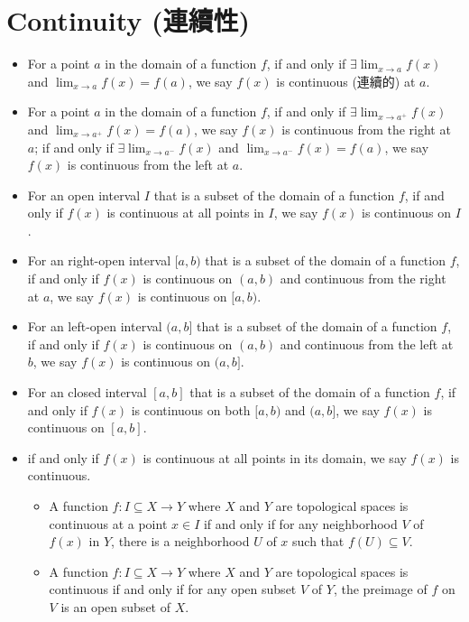 \documentclass[a4paper,12pt]{report}
\begin{document}
\section{Continuity (連續性)}
\begin{itemize}
\item For a point $a$ in the domain of a function $f$, if and only if $\exists\lim_{x\to a}f(x)$ and $\lim_{x\to a}f(x)=f(a)$, we say $f(x)$ is continuous (連續的) at $a$.
\item For a point $a$ in the domain of a function $f$, if and only if $\exists\lim_{x\to a^+}f(x)$ and $\lim_{x\to a^+}f(x)=f(a)$, we say $f(x)$ is continuous from the right at $a$; if and only if $\exists \lim_{x\to a^-} f(x)$ and $\lim_{x\to a^-} f(x)=f(a)$, we say $f(x)$ is continuous from the left at $a$.
\item For an open interval $I$ that is a subset of the domain of a function $f$, if and only if $f(x)$ is continuous at all points in $I$, we say $f(x)$ is continuous on $I$.
\item For an right-open interval $[a,b)$ that is a subset of the domain of a function $f$, if and only if $f(x)$ is continuous on $(a,b)$ and continuous from the right at $a$, we say $f(x)$ is continuous on $[a,b)$.
\item For an left-open interval $(a,b]$ that is a subset of the domain of a function $f$, if and only if $f(x)$ is continuous on $(a,b)$ and continuous from the left at $b$, we say $f(x)$ is continuous on $(a,b]$.
\item For an closed interval $[a,b]$ that is a subset of the domain of a function $f$, if and only if $f(x)$ is continuous on both $[a,b)$ and $(a,b]$, we say $f(x)$ is continuous on $[a,b]$.
\item if and only if $f(x)$ is continuous at all points in its domain, we say $f(x)$ is continuous.
\eit
{}
\begin{itemize}
\item A function $f\colon I\subseteq X\to Y$ where $X$ and $Y$ are topological spaces is continuous at a point $x\in I$ if and only if for any neighborhood $V$ of $f(x)$ in $Y$, there is a neighborhood $U$ of $x$ such that $f(U)\subseteq V$.
\item A function $f\colon I\subseteq X\to Y$ where $X$ and $Y$ are topological spaces is continuous if and only if for any open subset $V$ of $Y$, the preimage of $f$ on $V$ is an open subset of $X$.

\end{itemize}
\end{itemize}
\end{document}
